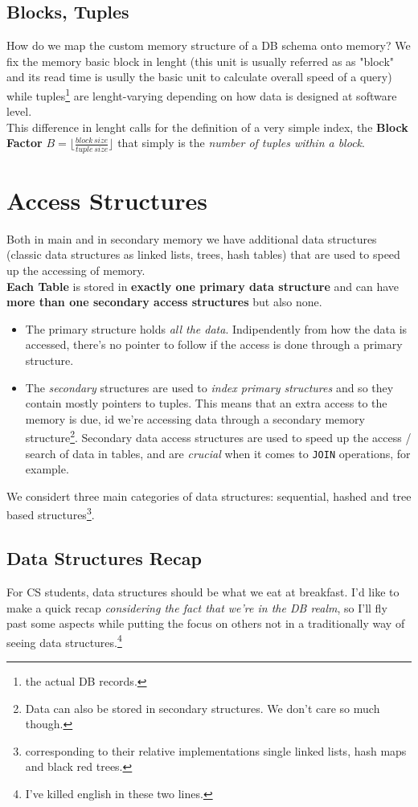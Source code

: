 \documentclass{article}
\begin{document}
			\subsection{Blocks, Tuples}
				How do we map the custom memory structure of a DB schema onto memory? We fix the memory basic block in lenght (this unit is usually referred as as "block" and its read time is usully the basic unit to calculate overall speed of a query) while tuples\footnote{the actual DB records.} are lenght-varying depending on how data is designed at software level.\\
				This difference in lenght calls for the definition of a very simple index, the \textbf{Block Factor} $B = \lfloor \frac{block\, size}{tuple\, size} \rfloor$ that simply is the \textit{number of tuples within a block}.

	
		\section{Access Structures}
			Both in main and in secondary memory we have additional data structures (classic data structures as linked lists, trees, hash tables) that are used to speed up the accessing of memory.\\
			\textbf{Each Table} is stored in \textbf{exactly one primary data structure} and can have \textbf{more than one secondary access structures} but also none.
			\begin{itemize}
				\item The primary structure holds \textit{all the data}. Indipendently from how the data is accessed, there's no pointer to follow if the access is done through a primary structure.
				\item The \textit{secondary} structures are used to \textit{index primary structures} and so they contain mostly pointers to tuples. This means that an extra access to the memory is due, id we're accessing data through a secondary memory structure\footnote{Data can also be stored in secondary structures. We don't care so much though.}. Secondary data access structures are used to speed up the access / search of data in tables, and are \textit{crucial} when it comes to \verb|JOIN| operations, for example.
			\end{itemize}
			We considert three main categories of data structures: sequential, hashed and tree based structures\footnote{corresponding to their relative implementations single linked lists, hash maps and black red trees.}.
	
			\subsection{Data Structures Recap}
				For CS students, data structures should be what we eat at breakfast. I'd like to make a quick recap \textit{considering the fact that we're in the DB realm}, so I'll fly past some aspects while putting the focus on others not in a traditionally way of seeing data structures.\footnote{I've killed english in these two lines.}
\end{document}
